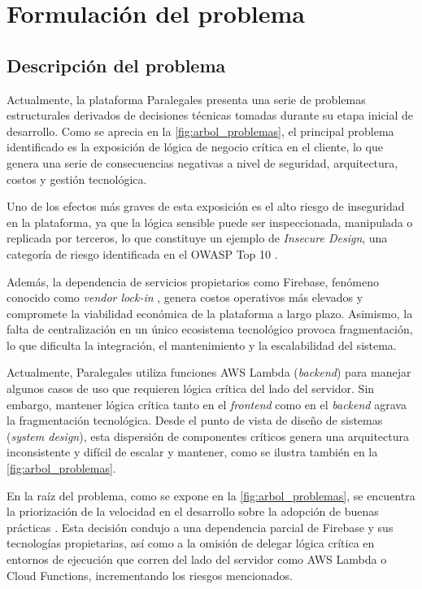 \section{Formulación del problema}

\subsection{Descripción del problema}
Actualmente, la plataforma Paralegales presenta una serie de problemas estructurales derivados de decisiones técnicas tomadas durante su etapa inicial de desarrollo. Como se aprecia en la \autoref{fig:arbol_problemas}, el principal problema identificado es la exposición de lógica de negocio crítica en el cliente, lo que genera una serie de consecuencias negativas a nivel de seguridad, arquitectura, costos y gestión tecnológica.

Uno de los efectos más graves de esta exposición es el alto riesgo de inseguridad en la plataforma, ya que la lógica sensible puede ser inspeccionada, manipulada o replicada por terceros, lo que constituye un ejemplo de \textit{Insecure Design}, una categoría de riesgo identificada en el OWASP Top 10 \cite{OWASP2021}.

Además, la dependencia de servicios propietarios como Firebase, fenómeno conocido como \textit{vendor lock-in} \cite{OparaMartins2016, OparaMartins2014,Harauzek2022}, genera costos operativos más elevados y compromete la viabilidad económica de la plataforma a largo plazo. Asimismo, la falta de centralización en un único ecosistema tecnológico provoca fragmentación, lo que dificulta la integración, el mantenimiento y la escalabilidad del sistema.

Actualmente, Paralegales utiliza funciones AWS Lambda (\textit{backend}) para manejar algunos casos de uso que requieren lógica crítica del lado del servidor. Sin embargo, mantener lógica crítica tanto en el \textit{frontend} como en el \textit{backend} agrava la fragmentación tecnológica. Desde el punto de vista de diseño de sistemas (\textit{system design}), esta dispersión de componentes críticos genera una arquitectura inconsistente y difícil de escalar y mantener, como se ilustra también en la \autoref{fig:arbol_problemas}.

En la raíz del problema, como se expone en la \autoref{fig:arbol_problemas}, se encuentra la priorización de la velocidad en el desarrollo sobre la adopción de buenas prácticas \cite{BirrEngwall2024}. Esta decisión condujo a una dependencia parcial de Firebase y sus tecnologías propietarias, así como a la omisión de delegar lógica crítica en entornos de ejecución que corren del lado del servidor como AWS Lambda o Cloud Functions, incrementando los riesgos mencionados.

